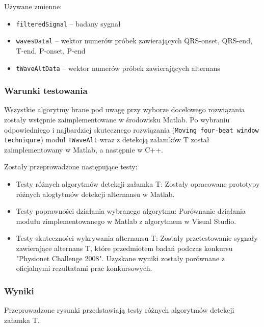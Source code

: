 \documentclass[a4paper, 11pt]{article}
\begin{document}
\medskip{}

Używane zmienne:
\begin{itemize}
\item \verb+filteredSignal+ --  badany sygnał
\item \verb+wavesDatal+ -- wektor numerów próbek zawierających QRS-onset, QRS-end, T-end, P-onset, P-end
\item \verb+tWaveAltData+ -- wektor numerów próbek zawierających alternans
\end{itemize}


\medskip{}

\subsubsection{Warunki testowania}
\label{sec::t_wave_alt:tests}
Wszystkie algorytmy brane pod uwagę przy wyborze docelowego rozwiązania zostały wstępnie zaimplementowane w środowisku Matlab. Po wybraniu odpowiedniego i najbardziej skutecznego rozwiązania (\verb|Moving four-beat window techniqure|) moduł \verb|TWaveAlt| wraz z detekcją załamków T został zaimplementowany w Matlab, a następnie w C++. 

Zostały przeprowadzone następujące testy:

\begin{itemize}
\item Testy różnych algorytmów detekcji załamka T: Zostały opracowane prototypy różnych alogtytmów detekcji alternansu w Matlab. 
\item Testy poprawności działania wybranego algorytmu: Porównanie działania modułu zimplementowanego w Matlab z algorytmem w Visual Studio. 
\item Testy skuteczności wykrywania alternansu T: Zostały przetestowanie sygnały zawierające alternans T, które przedmiotem badań podczas konkursu "Physionet Challenge 2008". Uzyskane wyniki zostały porównane z oficjalnymi rezultatami prac konkursowych.
\end{itemize}

\subsubsection{Wyniki}
\label{sec::t_wave_alt:results}
Przeprowadzone rysunki przedstawiają testy różnych algorytmów detekcji załamka T.
\end{document}
